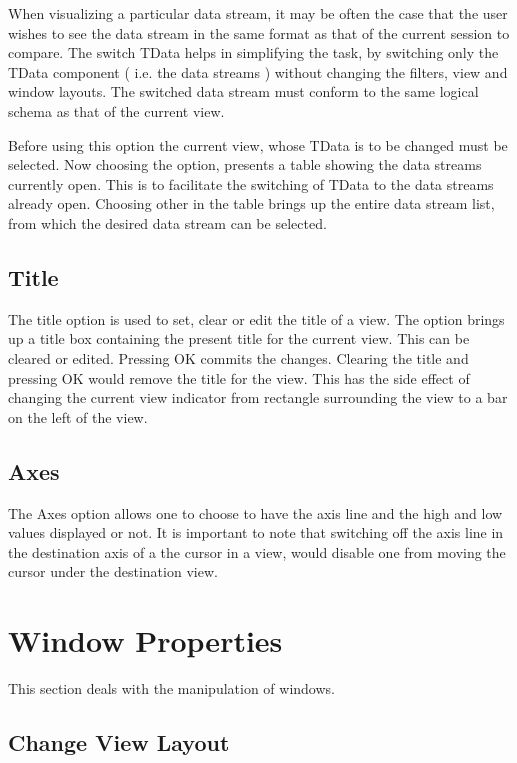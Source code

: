 When visualizing a particular data stream, it may be often the case that the user wishes to see the data stream in the same format as that of the current session to compare. The switch TData helps in simplifying the task, by switching only the TData component ( i.e. the data streams ) without changing the filters, view and window layouts. The switched data stream must conform to the same logical schema as that of the current  view.

Before using this option the current view, whose TData is to be changed must be selected.  Now choosing the option, presents a table showing the data streams currently open. This is to facilitate the switching of TData to the data streams already open. Choosing other in the table brings up the entire data stream list, from which the desired data stream can be selected.


\subsection{Title}

The title option is used to set, clear or edit the title of a view. The option brings up a title box containing the present title for the current view. This can be cleared or edited. Pressing OK commits the changes. Clearing the title and pressing OK would remove the title for the view. This has the side effect of changing the current view indicator from  rectangle surrounding the view to a bar on the left of the view.

\subsection{Axes}

The Axes option allows one to choose to have the axis line and the high and low values displayed or not. It is important to note that switching off the axis line in the destination axis of a the cursor in a view, would disable one from moving the cursor under the  destination view.

\section{Window Properties}

This section deals with the manipulation of windows.

\subsection{Change View Layout}

